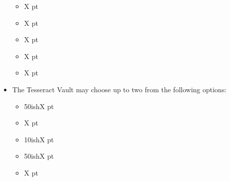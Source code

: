 \begin{minipage}[t]{0.72\textwidth}
\begin{itemize}
\begin{itemize}
			\item {} \dotfill X pt
			\item {} \dotfill X pt
			\item {} \dotfill X pt
			\item {} \dotfill X pt
			\item {} \dotfill X pt
		\end{itemize}
		\item The Tesseract Vault may choose up to two from the following options:
		\begin{itemize}
			\item {} \dotfill 50ishX pt
			\item {} \dotfill X pt
			\item {} \dotfill 10ishX pt
			\item {} \dotfill 50ishX pt
			\item {} \dotfill X pt
		\end{itemize}
	\end{itemize}
\end{minipage}



\newpage
\subsubsection[Transcendent C'Tan]{}

